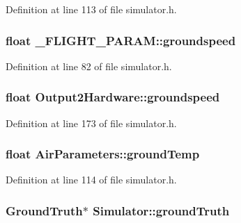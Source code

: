 \-Definition at line 113 of file simulator.\-h.

\hypertarget{group___h_i_t_l_plugin_ga2a4535a23a5ca83f655298d2494556d5}{
\subsubsection[{groundspeed}]{\setlength{\rightskip}{0pt plus 5cm}float {\bf \-\_\-\-F\-L\-I\-G\-H\-T\-\_\-\-P\-A\-R\-A\-M\-::groundspeed}}}\label{group___h_i_t_l_plugin_ga2a4535a23a5ca83f655298d2494556d5}


\-Definition at line 82 of file simulator.\-h.

\hypertarget{group___h_i_t_l_plugin_ga6cab485f36b93a2e86e248bcc6b240f1}{
\subsubsection[{groundspeed}]{\setlength{\rightskip}{0pt plus 5cm}float {\bf \-Output2\-Hardware\-::groundspeed}}}\label{group___h_i_t_l_plugin_ga6cab485f36b93a2e86e248bcc6b240f1}


\-Definition at line 173 of file simulator.\-h.

\hypertarget{group___h_i_t_l_plugin_gab28b8a30520fdf84e924254a8e7f0167}{
\subsubsection[{ground\-Temp}]{\setlength{\rightskip}{0pt plus 5cm}float {\bf \-Air\-Parameters\-::ground\-Temp}}}\label{group___h_i_t_l_plugin_gab28b8a30520fdf84e924254a8e7f0167}


\-Definition at line 114 of file simulator.\-h.

\hypertarget{group___h_i_t_l_plugin_ga6c62059f6d424f96ad1142bfe8885e3a}{
\subsubsection[{ground\-Truth}]{\setlength{\rightskip}{0pt plus 5cm}\-Ground\-Truth$\ast$ {\bf \-Simulator\-::ground\-Truth}}}\label{group___h_i_t_l_plugin_ga6c62059f6d424f96ad1142bfe8885e3a}


